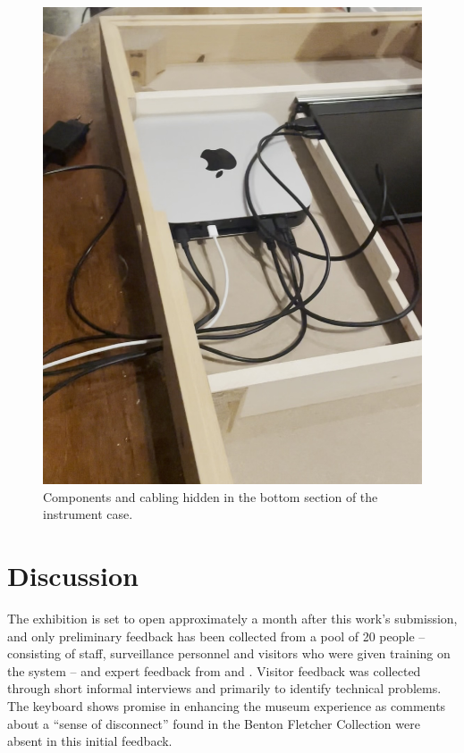 \begin{figure}
    \centering
    \includegraphics[width=0.8\linewidth,trim={0 5cm 0 0},clip]{src/images/mac-mini.jpg}
    \caption{Components and cabling hidden in the bottom section of the instrument case.}
    \label{fig:mac-mini}
\end{figure}

\section{Discussion}\label{context}

The exhibition is set to open approximately a month after this work's submission, and only preliminary feedback has been collected from a pool of 20 people -- consisting of staff, surveillance personnel and visitors who were given training on the system -- and expert feedback from  and .
Visitor feedback was collected through short informal interviews and primarily to identify technical problems.
The keyboard shows promise in enhancing the museum experience as comments about a ``sense of disconnect'' found in the Benton Fletcher Collection \cite{McAlpine2014} were absent in this initial feedback.


